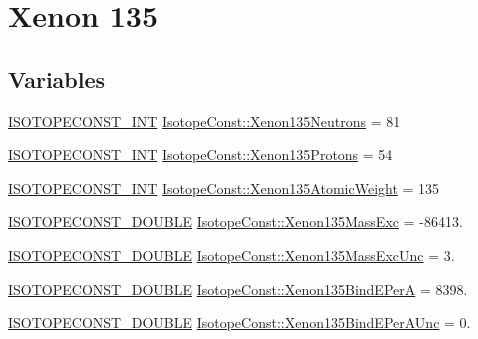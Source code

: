 \hypertarget{group___isotope_const-_xenon-_xe135}{}\section{Xenon 135}
\label{group___isotope_const-_xenon-_xe135}
\subsection*{Variables}
\begin{DoxyCompactItemize}
\item 
\mbox{\hyperlink{group___isotope_const-_macros_ga5f18360b3e99483a35c32d789e62621c}{I\+S\+O\+T\+O\+P\+E\+C\+O\+N\+S\+T\+\_\+\+I\+NT}} \mbox{\hyperlink{group___isotope_const-_xenon-_xe135_ga17117713d39af128225f39024e4b84a9}{Isotope\+Const\+::\+Xenon135\+Neutrons}} = 81
\item 
\mbox{\hyperlink{group___isotope_const-_macros_ga5f18360b3e99483a35c32d789e62621c}{I\+S\+O\+T\+O\+P\+E\+C\+O\+N\+S\+T\+\_\+\+I\+NT}} \mbox{\hyperlink{group___isotope_const-_xenon-_xe135_ga3693f1c28669c46588ead8648ee19275}{Isotope\+Const\+::\+Xenon135\+Protons}} = 54
\item 
\mbox{\hyperlink{group___isotope_const-_macros_ga5f18360b3e99483a35c32d789e62621c}{I\+S\+O\+T\+O\+P\+E\+C\+O\+N\+S\+T\+\_\+\+I\+NT}} \mbox{\hyperlink{group___isotope_const-_xenon-_xe135_ga25cb3cc117ae4d519b9257c1b5f4fdcf}{Isotope\+Const\+::\+Xenon135\+Atomic\+Weight}} = 135
\item 
\mbox{\hyperlink{group___isotope_const-_macros_ga8f45a7272ce02c0b4c65c44636ed719a}{I\+S\+O\+T\+O\+P\+E\+C\+O\+N\+S\+T\+\_\+\+D\+O\+U\+B\+LE}} \mbox{\hyperlink{group___isotope_const-_xenon-_xe135_gaf8e623a9dcc4e675956e7de476e76829}{Isotope\+Const\+::\+Xenon135\+Mass\+Exc}} = -\/86413.
\item 
\mbox{\hyperlink{group___isotope_const-_macros_ga8f45a7272ce02c0b4c65c44636ed719a}{I\+S\+O\+T\+O\+P\+E\+C\+O\+N\+S\+T\+\_\+\+D\+O\+U\+B\+LE}} \mbox{\hyperlink{group___isotope_const-_xenon-_xe135_ga78b57a9f54bc3684ab3a6ee679326113}{Isotope\+Const\+::\+Xenon135\+Mass\+Exc\+Unc}} = 3.
\item 
\mbox{\hyperlink{group___isotope_const-_macros_ga8f45a7272ce02c0b4c65c44636ed719a}{I\+S\+O\+T\+O\+P\+E\+C\+O\+N\+S\+T\+\_\+\+D\+O\+U\+B\+LE}} \mbox{\hyperlink{group___isotope_const-_xenon-_xe135_ga940f7160cbb121a2d3fd6e32966a10f4}{Isotope\+Const\+::\+Xenon135\+Bind\+E\+PerA}} = 8398.
\item 
\mbox{\hyperlink{group___isotope_const-_macros_ga8f45a7272ce02c0b4c65c44636ed719a}{I\+S\+O\+T\+O\+P\+E\+C\+O\+N\+S\+T\+\_\+\+D\+O\+U\+B\+LE}} \mbox{\hyperlink{group___isotope_const-_xenon-_xe135_ga7ac8bc8d70900f6d57631d7c099919c4}{Isotope\+Const\+::\+Xenon135\+Bind\+E\+Per\+A\+Unc}} = 0.

\end{DoxyCompactItemize}
